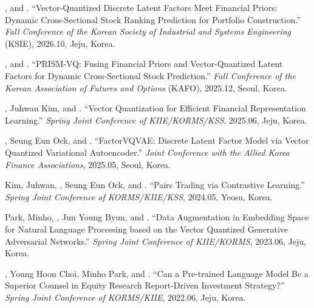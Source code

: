 \documentclass[11pt]{article}
\begin{document}
\begin{nlist}
\item[{[7]}] \mefirst, and \song. ``Vector-Quantized Discrete Latent Factors Meet Financial Priors: Dynamic Cross-Sectional Stock Ranking Prediction for Portfolio Construction.'' \textit{Fall Conference of the Korean Society of Industrial and Systems Engineering} (KSIE), 2026.10, Jeju, Korea.
\item[{[6]}] \mefirst, and \song. ``PRISM-VQ: Fusing Financial Priors and Vector-Quantized Latent Factors for Dynamic Cross-Sectional Stock Prediction.'' \textit{Fall Conference of the Korean Association of Futures and Options} (KAFO), 2025.12, Seoul, Korea.
\item[{[5]}] \mefirst, Juhwan Kim, and \song. ``Vector Quantization for Efficient Financial Representation Learning.'' \textit{Spring Joint Conference of KIIE/KORMS/KSS}, 2025.06, Jeju, Korea.
\item[{[4]}] \mefirst, Seung Eun Ock, and \song. ``FactorVQVAE: Discrete Latent Factor Model via Vector Quantized Variational Autoencoder.'' \textit{Joint Conference with the Allied Korea Finance Associations}, 2025.05, Seoul, Korea.
\item[{[3]}] Kim, Juhwan, \me, Seung Eun Ock, and \song. ``Pairs Trading via Contrastive Learning.'' \textit{Spring Joint Conference of KORMS/KIIE/KSS}, 2024.05, Yeosu, Korea.
\item[{[2]}] Park, Minho, \me, Jun Young Byun, and \song. ``Data Augmentation in Embedding Space for Natural Language Processing based on the Vector Quantized Generative Adversarial Networks.'' \textit{Spring Joint Conference of KIIE/KORMS}, 2023.06, Jeju, Korea.
\item[{[1]}] \mefirst, Young Hoon Choi, Minho Park, and \song. ``Can a Pre-trained Language Model Be a Superior Counsel in Equity Research Report-Driven Investment Strategy?'' \textit{Spring Joint Conference of KORMS/KIIE}, 2022.06, Jeju, Korea.
\end{nlist}
\end{document}
